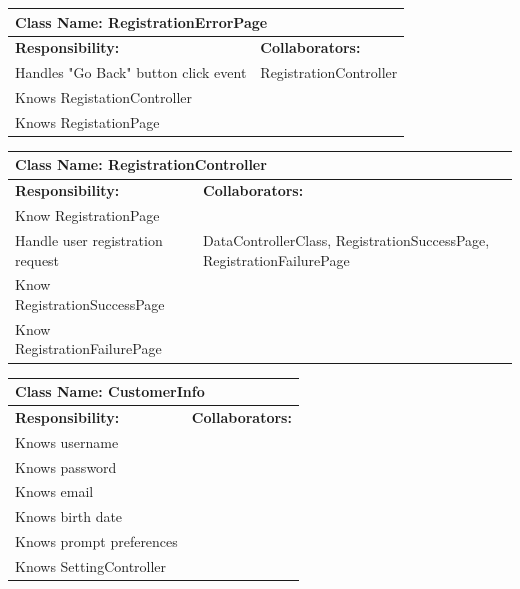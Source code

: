 \documentclass[]{article}
\begin{document}
	\begin{table}[H]
	\centering
	\begin{tabular}{|p{6cm}|p{6cm}|}
	\hline 
		\multicolumn{2}{|l|}{\textbf{Class Name: RegistrationErrorPage}} \\
	\hline
	\textbf{Responsibility:} & \textbf{Collaborators:} \\
	\hline 
	Handles "Go Back" button click event  & RegistrationController\\ \hline 
	Knows RegistationController &\\ \hline
	Knows RegistationPage &\\ \hline
	\end{tabular}
	\end{table}
		
	\begin{table}[H]
	\centering
	\begin{tabular}{|p{6cm}|p{6cm}|}
	\hline 
		\multicolumn{2}{|l|}{\textbf{Class Name: RegistrationController}} \\
	\hline
	\textbf{Responsibility:} & \textbf{Collaborators:} \\
	\hline
	Know RegistrationPage&\\ \hline
	Handle user registration request & DataControllerClass, RegistrationSuccessPage, RegistrationFailurePage\\ \hline
	Know RegistrationSuccessPage &\\ \hline
	Know RegistrationFailurePage &\\ \hline
	\end{tabular}
	\end{table}
	
	\begin{table}[H]
	\centering
	\begin{tabular}{|p{6cm}|p{6cm}|}
	\hline 
		\multicolumn{2}{|l|}{\textbf{Class Name: CustomerInfo}} \\
	\hline
	\textbf{Responsibility:} & \textbf{Collaborators:} \\
	\hline 
	Knows username&\\ \hline
	Knows password&\\ \hline 
	Knows email&\\ \hline 
	Knows birth date&\\ \hline 
	Knows prompt preferences &\\ \hline
	Knows SettingController &\\ \hline
	\end{tabular}
	\end{table}
		
\end{document}
